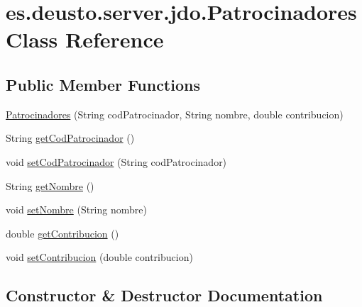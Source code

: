 \hypertarget{classes_1_1deusto_1_1server_1_1jdo_1_1_patrocinadores}{}\section{es.\+deusto.\+server.\+jdo.\+Patrocinadores Class Reference}
\label{classes_1_1deusto_1_1server_1_1jdo_1_1_patrocinadores}
\subsection*{Public Member Functions}
\begin{DoxyCompactItemize}
\item 
\mbox{\hyperlink{classes_1_1deusto_1_1server_1_1jdo_1_1_patrocinadores_a7e84637c5aad6a3fce05f9707261a1a8}{Patrocinadores}} (String cod\+Patrocinador, String nombre, double contribucion)
\item 
String \mbox{\hyperlink{classes_1_1deusto_1_1server_1_1jdo_1_1_patrocinadores_a8eb8dbed078066e785bbcae2dc4a2097}{get\+Cod\+Patrocinador}} ()
\item 
void \mbox{\hyperlink{classes_1_1deusto_1_1server_1_1jdo_1_1_patrocinadores_a0b14ac2e577e95083a4e05a6ffc6146e}{set\+Cod\+Patrocinador}} (String cod\+Patrocinador)
\item 
String \mbox{\hyperlink{classes_1_1deusto_1_1server_1_1jdo_1_1_patrocinadores_a22f45753d943a74eedecc6663ed73295}{get\+Nombre}} ()
\item 
void \mbox{\hyperlink{classes_1_1deusto_1_1server_1_1jdo_1_1_patrocinadores_ab972f72eef2fe2259d4c70be486184f3}{set\+Nombre}} (String nombre)
\item 
double \mbox{\hyperlink{classes_1_1deusto_1_1server_1_1jdo_1_1_patrocinadores_a7f7c99720f20dcbfbec1b31babe7c59f}{get\+Contribucion}} ()
\item 
void \mbox{\hyperlink{classes_1_1deusto_1_1server_1_1jdo_1_1_patrocinadores_aaf73e94951085646b7373e2a76a7667c}{set\+Contribucion}} (double contribucion)
\end{DoxyCompactItemize}


\subsection{Constructor \& Destructor Documentation}
\mbox{\label{classes_1_1deusto_1_1server_1_1jdo_1_1_patrocinadores_a7e84637c5aad6a3fce05f9707261a1a8}} 
